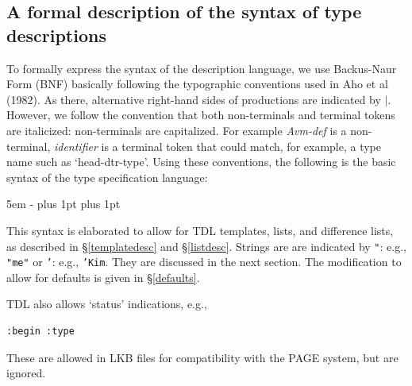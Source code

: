 \documentclass[12pt]{report}
\begin{document}
\subsection{A formal description of the syntax of type descriptions}
\label{bnftype}

To formally express the syntax of the description language, we
use Backus-Naur Form (BNF) basically following the typographic conventions used
in Aho et al (1982).
As there, alternative right-hand sides of productions are indicated by
$|$.  
However, we follow the convention that both non-terminals and
terminal tokens are italicized: non-terminals are capitalized.
For example {\it Avm-def} is a non-terminal, {\it identifier}
is a terminal token that could match, for example, a type name
such as `head-dtr-type'.
Using these conventions, the following is the basic
syntax of the type specification 
language:
\begin{list}{}
   {\leftmargin 5em
    \itemindent -\leftmargin
    \itemsep 0pt plus 1pt
    \parsep 0pt plus 1pt}
\end{list}
This syntax is elaborated to allow for 
TDL templates, lists, and difference lists,
as described in \S\ref{templatedesc} and \S\ref{listdesc}.  Strings are 
are indicated by
{\tt "}: e.g., {\tt "me"} or {\tt '}: e.g.,  {\tt 'Kim}.  They are
discussed in the next section.  The modification to allow
for defaults is given in \S\ref{defaults}.

TDL also allows `status' indications, e.g.,
\begin{verbatim}
:begin :type
\end{verbatim}
These are allowed in LKB files for compatibility with the PAGE
system, but are ignored.  
\end{document}
